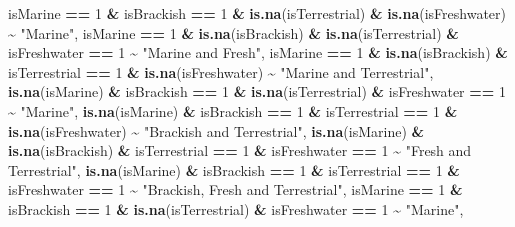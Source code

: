 \documentclass[
]{article}
\newenvironment{Shaded}{\begin{snugshade}}{\end{snugshade}}
\newcommand{\DecValTok}[1]{\textcolor[rgb]{0.00,0.00,0.81}{#1}}
\newcommand{\FunctionTok}[1]{\textcolor[rgb]{0.13,0.29,0.53}{\textbf{#1}}}
\newcommand{\NormalTok}[1]{#1}
\newcommand{\SpecialCharTok}[1]{\textcolor[rgb]{0.81,0.36,0.00}{\textbf{#1}}}
\newcommand{\StringTok}[1]{\textcolor[rgb]{0.31,0.60,0.02}{#1}}
\begin{document}
\begin{Shaded}
\begin{Highlighting}[]
\NormalTok{    isMarine }\SpecialCharTok{==} \DecValTok{1} \SpecialCharTok{\&}\NormalTok{ isBrackish }\SpecialCharTok{==} \DecValTok{1} \SpecialCharTok{\&} \FunctionTok{is.na}\NormalTok{(isTerrestrial) }\SpecialCharTok{\&} \FunctionTok{is.na}\NormalTok{(isFreshwater) }\SpecialCharTok{\textasciitilde{}} \StringTok{"Marine"}\NormalTok{,}
\NormalTok{    isMarine }\SpecialCharTok{==} \DecValTok{1} \SpecialCharTok{\&} \FunctionTok{is.na}\NormalTok{(isBrackish) }\SpecialCharTok{\&} \FunctionTok{is.na}\NormalTok{(isTerrestrial) }\SpecialCharTok{\&}\NormalTok{ isFreshwater }\SpecialCharTok{==} \DecValTok{1} \SpecialCharTok{\textasciitilde{}} \StringTok{"Marine and Fresh"}\NormalTok{,}
\NormalTok{    isMarine }\SpecialCharTok{==} \DecValTok{1} \SpecialCharTok{\&} \FunctionTok{is.na}\NormalTok{(isBrackish) }\SpecialCharTok{\&}\NormalTok{ isTerrestrial }\SpecialCharTok{==} \DecValTok{1} \SpecialCharTok{\&} \FunctionTok{is.na}\NormalTok{(isFreshwater) }\SpecialCharTok{\textasciitilde{}} \StringTok{"Marine and Terrestrial"}\NormalTok{,}
    \FunctionTok{is.na}\NormalTok{(isMarine) }\SpecialCharTok{\&}\NormalTok{ isBrackish }\SpecialCharTok{==} \DecValTok{1} \SpecialCharTok{\&} \FunctionTok{is.na}\NormalTok{(isTerrestrial) }\SpecialCharTok{\&}\NormalTok{ isFreshwater }\SpecialCharTok{==} \DecValTok{1} \SpecialCharTok{\textasciitilde{}} \StringTok{"Marine"}\NormalTok{,}
    \FunctionTok{is.na}\NormalTok{(isMarine) }\SpecialCharTok{\&}\NormalTok{ isBrackish }\SpecialCharTok{==} \DecValTok{1} \SpecialCharTok{\&}\NormalTok{ isTerrestrial }\SpecialCharTok{==} \DecValTok{1} \SpecialCharTok{\&} \FunctionTok{is.na}\NormalTok{(isFreshwater) }\SpecialCharTok{\textasciitilde{}} \StringTok{"Brackish and Terrestrial"}\NormalTok{,}
    \FunctionTok{is.na}\NormalTok{(isMarine) }\SpecialCharTok{\&} \FunctionTok{is.na}\NormalTok{(isBrackish) }\SpecialCharTok{\&}\NormalTok{ isTerrestrial }\SpecialCharTok{==} \DecValTok{1} \SpecialCharTok{\&}\NormalTok{ isFreshwater }\SpecialCharTok{==} \DecValTok{1} \SpecialCharTok{\textasciitilde{}} \StringTok{"Fresh and Terrestrial"}\NormalTok{,}
    \FunctionTok{is.na}\NormalTok{(isMarine) }\SpecialCharTok{\&}\NormalTok{ isBrackish }\SpecialCharTok{==} \DecValTok{1} \SpecialCharTok{\&}\NormalTok{ isTerrestrial }\SpecialCharTok{==} \DecValTok{1} \SpecialCharTok{\&}\NormalTok{ isFreshwater }\SpecialCharTok{==} \DecValTok{1} \SpecialCharTok{\textasciitilde{}} \StringTok{"Brackish, Fresh and Terrestrial"}\NormalTok{,}
\NormalTok{    isMarine }\SpecialCharTok{==} \DecValTok{1} \SpecialCharTok{\&}\NormalTok{ isBrackish }\SpecialCharTok{==} \DecValTok{1} \SpecialCharTok{\&} \FunctionTok{is.na}\NormalTok{(isTerrestrial) }\SpecialCharTok{\&}\NormalTok{ isFreshwater }\SpecialCharTok{==} \DecValTok{1} \SpecialCharTok{\textasciitilde{}} \StringTok{"Marine"}\NormalTok{,}

\end{Highlighting}
\end{Shaded}
\end{document}
